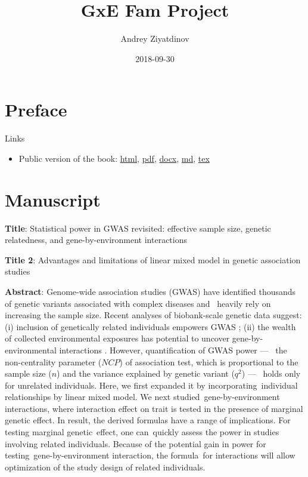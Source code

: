 \documentclass[]{book}
\title{GxE Fam Project}
\author{Andrey Ziyatdinov}
\date{2018-09-30}
\providecommand{\tightlist}{%
  \setlength{\itemsep}{0pt}\setlength{\parskip}{0pt}}
\begin{document}
\maketitle

\setlength{\abovedisplayskip}{-5pt}
\setlength{\abovedisplayshortskip}{-5pt}

{
\hypersetup{linkcolor=black}
\setcounter{tocdepth}{2}
\tableofcontents
}
\chapter*{Preface}\label{preface}

Links

\begin{itemize}
\tightlist
\item
  Public version of the book:
  \href{https://hemostat.github.io/Public/Papers/05-int-rel/bookdown/index.html}{html},
  \href{https://hemostat.github.io/Public/Papers/05-int-rel/bookdown/gxefam.pdf}{pdf},
  \href{https://hemostat.github.io/Public/Papers/05-int-rel/bookdown/gxefam.docx}{docx},
  \href{https://hemostat.github.io/Public/Papers/05-int-rel/bookdown/gxefam.md}{md},
  \href{https://hemostat.github.io/Public/Papers/05-int-rel/bookdown/gxefam.tex}{tex}
\end{itemize}

\chapter{Manuscript}\label{manuscript}

\textbf{Title}: Statistical power in GWAS revisited: effective sample
size, genetic relatedness, and gene-by-environment interactions

\textbf{Title 2}: Advantages and limitations of linear mixed model in
genetic association studies

\textbf{Abstract}: Genome-wide association studies (GWAS) have
identified thousands of genetic variants associated with complex
diseases and~ heavily rely on increasing the sample size. Recent
analyses of biobank-scale genetic data suggest: (i) inclusion of
genetically related individuals empowers GWAS \citep{loh2018mixed}; (ii)
the wealth of collected environmental exposures has potential to uncover
gene-by-environmental interactions \citep{young2016multiple}. However,
quantification of GWAS power ---~ the non-centrality parameter (\(NCP\))
of association test, which is proportional to the sample size (\(n\))
and the variance explained by genetic variant (\(q^2\)) ---~ holds only
for unrelated individuals. Here, we first expanded it by
incorporating~individual relationships by linear mixed model. We next
studied~gene-by-environment interactions, where interaction effect on
trait is tested in the presence of marginal genetic effect. In result,
the derived formulas have a range of implications. For testing marginal
genetic~effect, one can~quickly assess the power in studies involving
related individuals. Because of the potential gain in power for
testing~gene-by-environment interaction, the formula~for interactions
will allow optimization of the study design of related individuals.
\end{document}
